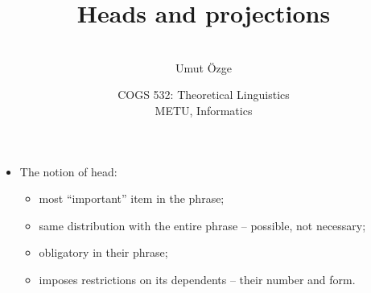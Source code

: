 \documentclass[ignorenonframetext,10pt,aspectratio=169]{beamer}
\title{Heads and projections}
\author{\ \\ \vspace{20pt} Umut \"Ozge\\  }
\date{COGS 532: Theoretical Linguistics\\ METU, Informatics}
\begin{document}
\begin{frame}\frametitle{}
\thispagestyle{empty}
\maketitle
\end{frame}

\begin{frame}[t,plain]{}

\end{frame}

\begin{frame}[t,plain]{}

\begin{itemize}
\item The notion of head:
\begin{itemize}
\item most ``important'' item in the phrase;
\item same distribution with the entire phrase -- possible, not necessary;
\item obligatory in their phrase;
\item imposes restrictions on its dependents -- their number and form.
\end{itemize}

\end{itemize}

\end{frame}

\begin{frame}[t,plain]{}



\end{frame}


\begin{frame}[t,plain]{}

\end{frame}

\begin{frame}[t,plain]{}

\end{frame}
\end{document}
